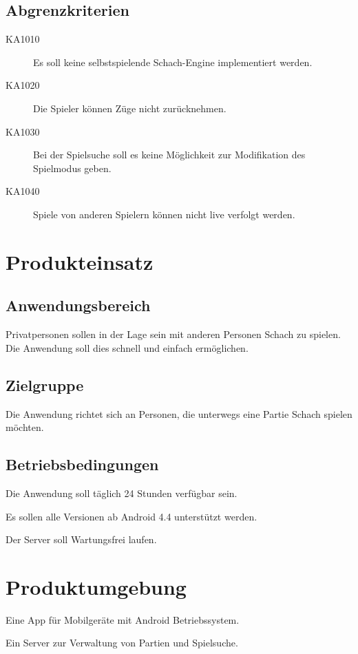 \documentclass[parskip=full]{scrartcl}
\begin{document}
\subsection{Abgrenzkriterien}
\begin{description}
\item[KA1010] Es soll keine selbstspielende Schach-Engine implementiert werden.
\item[KA1020] Die Spieler können Züge nicht zurücknehmen.
\item[KA1030] Bei der Spielsuche soll es keine Möglichkeit zur Modifikation des Spielmodus geben.
\item[KA1040] Spiele von anderen Spielern können nicht live verfolgt werden.
\end{description}
\section{Produkteinsatz}
	\subsection{Anwendungsbereich}
		
			Privatpersonen sollen in der Lage sein mit anderen Personen \gls{Schach} zu spielen. Die Anwendung soll dies schnell und einfach ermöglichen.	
		
	\subsection{Zielgruppe}
		
			Die Anwendung richtet sich an Personen, die unterwegs eine Partie \gls{Schach} spielen möchten.
		
	\subsection{Betriebsbedingungen}
		\begin{description}
			\item Die Anwendung soll täglich 24 Stunden verfügbar sein.
			\item Es sollen alle Versionen ab Android 4.4 unterstützt werden.
			\item Der Server soll Wartungsfrei laufen.	
		\end{description}
\section{Produktumgebung}
	\begin{description}
		\item Eine App für Mobilgeräte mit \gls{Android} Betriebssystem.
		\item Ein Server zur Verwaltung von Partien und Spielsuche.		
	\end{description}
\end{document}
